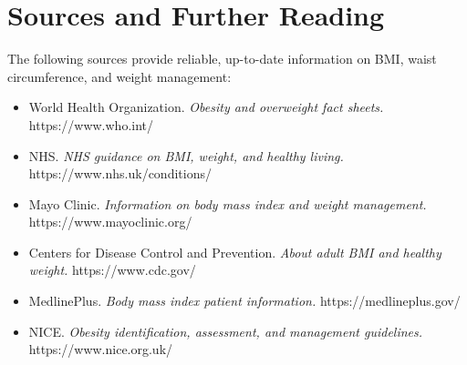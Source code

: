 \section*{Sources and Further Reading}
The following sources provide reliable, up-to-date information on BMI, waist circumference, and weight management:

\begin{itemize}
    \item World Health Organization. \textit{Obesity and overweight fact sheets.} https://www.who.int/
    \item NHS. \textit{NHS guidance on BMI, weight, and healthy living.} https://www.nhs.uk/conditions/
    \item Mayo Clinic. \textit{Information on body mass index and weight management.} https://www.mayoclinic.org/
    \item Centers for Disease Control and Prevention. \textit{About adult BMI and healthy weight.} https://www.cdc.gov/
    \item MedlinePlus. \textit{Body mass index patient information.} https://medlineplus.gov/
    \item NICE. \textit{Obesity identification, assessment, and management guidelines.} https://www.nice.org.uk/
\end{itemize}
